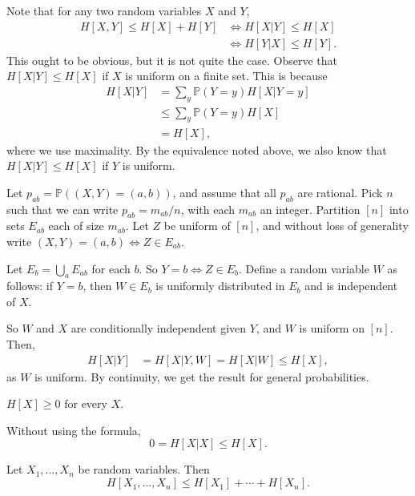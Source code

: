 \documentclass[12pt]{article}
\begin{document}
\begin{proofbox}
	Note that for any two random variables $X$ and $Y$,
	\begin{align*}
		H[X,Y] \leq H[X] + H[Y] &\iff H[X|Y] \leq H[X] \\
					&\iff H[Y|X] \leq H[Y].
	\end{align*}
	This ought to be obvious, but it is not quite the case. Observe that $H[X|Y] \leq H[X]$ if $X$ is uniform on a finite set. This is because
	\begin{align*}
		H[X|Y] &= \sum_{y} \mathbb{P}(Y = y) H[X|Y = y] \\
		       &\leq \sum_y \mathbb{P}(Y = y) H[X] \\
		       &= H[X],
	\end{align*}
	where we use maximality. By the equivalence noted above, we also know that $H[X|Y] \leq H[X]$ if $Y$ is uniform.

	Let $p_{ab} = \mathbb{P}((X,Y) = (a, b))$, and assume that all $p_{ab}$ are rational. Pick $n$ such that we can write $p_{ab} = m_{ab}/n$, with each $m_{ab}$ an integer. Partition $[n]$ into sets $E_{ab}$ each of size $m_{ab}$. Let $Z$ be uniform of $[n]$, and without loss of generality write $(X, Y) = (a, b) \iff Z \in E_{ab}$.

	Let $E_b = \bigcup_a E_{ab}$ for each $b$. So $Y = b \iff Z \in E_b$. Define a random variable $W$ as follows: if $Y = b$, then $W \in E_b$ is uniformly distributed in $E_b$ and is independent of $X$.

	So $W$ and $X$ are conditionally independent given $Y$, and $W$ is uniform on $[n]$. Then,
	\begin{align*}
		H[X|Y] &= H[X|Y,W] = H[X|W] \leq H[X],
	\end{align*}
	as $W$ is uniform. By continuity, we get the result for general probabilities.
\end{proofbox}

\begin{corollary}
	$H[X] \geq 0$ for every $X$.
\end{corollary}

\begin{proofbox}
	Without using the formula,
	\[
		0 = H[X|X] \leq H[X].
	\]
\end{proofbox}

\begin{corollary}
	Let $X_1, \ldots, X_n$ be random variables. Then
	\[
		H[X_1, \ldots, X_n] \leq H[X_1] + \cdots + H[X_n].
	\]
\end{corollary}
\end{document}
